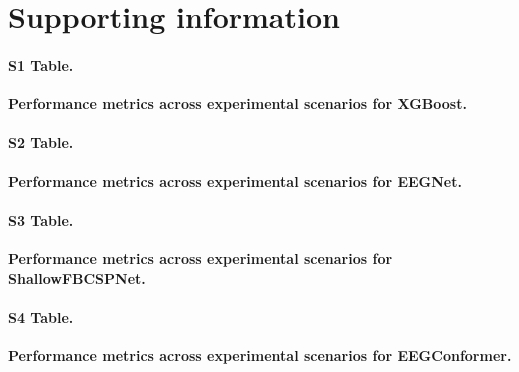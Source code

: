 \documentclass[10pt,letterpaper]{article}
\newcommand{\supportinginformationstyle}{%
  \captionsetup[table]{labelformat=plossupporting,labelsep=period}%
  \setcounter{table}{0}%
  \renewcommand{\thetable}{\arabic{table}}%
}
\begin{document}
%

\nolinenumbers



\section*{Supporting information}

\supportinginformationstyle


\paragraph*{S1 Table.}
\label{S1_Table}
\textbf{Performance metrics across experimental scenarios for XGBoost.}

\paragraph*{S2 Table.}
\label{S2_Table}
\textbf{Performance metrics across experimental scenarios for EEGNet.}

\paragraph*{S3 Table.}
\label{S3_Table}
\textbf{Performance metrics across experimental scenarios for ShallowFBCSPNet.}

\paragraph*{S4 Table.}
\label{S4_Table}
\textbf{Performance metrics across experimental scenarios for EEGConformer.}
\end{document}

